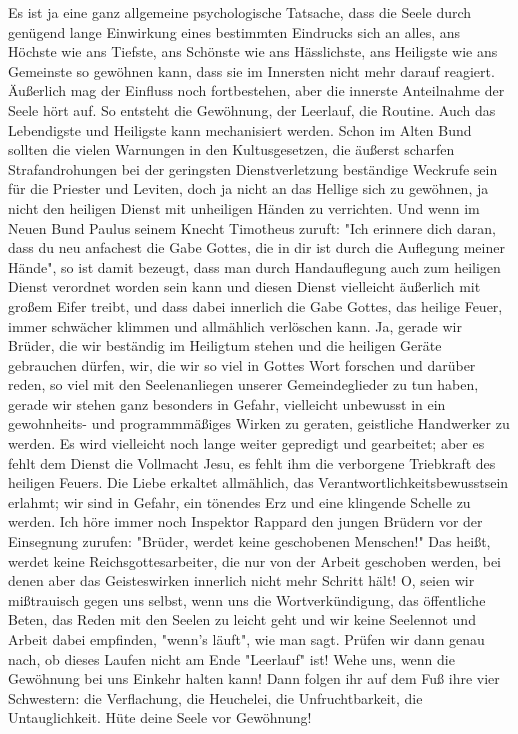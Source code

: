 \documentclass[a5paper,openany]{book}
\begin{document}
Es ist ja eine ganz allgemeine psychologische Tatsache, dass die Seele durch genügend lange Einwirkung eines bestimmten Eindrucks sich an alles, ans Höchste wie ans Tiefste, ans Schönste wie ans Hässlichste, ans Heiligste wie ans Gemeinste so gewöhnen kann, dass sie im Innersten nicht mehr darauf reagiert. Äußerlich mag der Einfluss noch fortbestehen, aber die innerste Anteilnahme der Seele hört auf. So entsteht die Gewöhnung, der Leerlauf, die Routine. Auch das Lebendigste und Heiligste kann mechanisiert werden. Schon im Alten Bund sollten die vielen Warnungen in den Kultusgesetzen, die äußerst scharfen Strafandrohungen bei der geringsten Dienstverletzung beständige Weckrufe sein für die Priester und Leviten, doch ja nicht an das Hellige sich zu gewöhnen, ja nicht den heiligen Dienst mit unheiligen Händen zu verrichten. Und wenn im Neuen Bund Paulus seinem Knecht Timotheus zuruft: "Ich erinnere dich daran, dass du neu anfachest die Gabe Gottes, die in dir ist durch die Auflegung meiner Hände", so ist damit bezeugt, dass man durch Handauflegung auch zum heiligen Dienst verordnet worden sein kann und diesen Dienst vielleicht äußerlich mit großem Eifer treibt, und dass dabei innerlich die Gabe Gottes, das heilige Feuer, immer schwächer klimmen und allmählich verlöschen kann. Ja, gerade wir Brüder, die wir beständig im Heiligtum stehen und die heiligen Geräte gebrauchen dürfen, wir, die wir so viel in Gottes Wort forschen und darüber reden, so viel mit den Seelenanliegen unserer Gemeindeglieder zu tun haben, gerade wir stehen ganz besonders in Gefahr, vielleicht unbewusst in ein gewohnheits- und programmmäßiges Wirken zu geraten, geistliche Handwerker zu werden. Es wird vielleicht noch lange weiter gepredigt und gearbeitet; aber es fehlt dem Dienst die Vollmacht Jesu, es fehlt ihm die verborgene Triebkraft des heiligen Feuers. Die Liebe erkaltet allmählich, das Verantwortlichkeitsbewusstsein erlahmt; wir sind in Gefahr, ein tönendes Erz und eine klingende Schelle zu werden. Ich höre immer noch Inspektor Rappard den jungen Brüdern vor der Einsegnung zurufen: "Brüder, werdet keine geschobenen Menschen!" Das heißt, werdet keine Reichsgottesarbeiter, die nur von der Arbeit geschoben werden, bei denen aber das Geisteswirken innerlich nicht mehr Schritt hält! O, seien wir mißtrauisch gegen uns selbst, wenn uns die Wortverkündigung, das öffentliche Beten, das Reden mit den Seelen zu leicht geht und wir keine Seelennot und Arbeit dabei empfinden, "wenn's läuft", wie man sagt. Prüfen wir dann genau nach, ob dieses Laufen nicht am Ende "Leerlauf" ist! Wehe uns, wenn die Gewöhnung bei uns Einkehr halten kann! Dann folgen ihr auf dem Fuß ihre vier Schwestern: die Verflachung, die Heuchelei, die Unfruchtbarkeit, die Untauglichkeit. Hüte deine Seele vor Gewöhnung!
\end{document}
